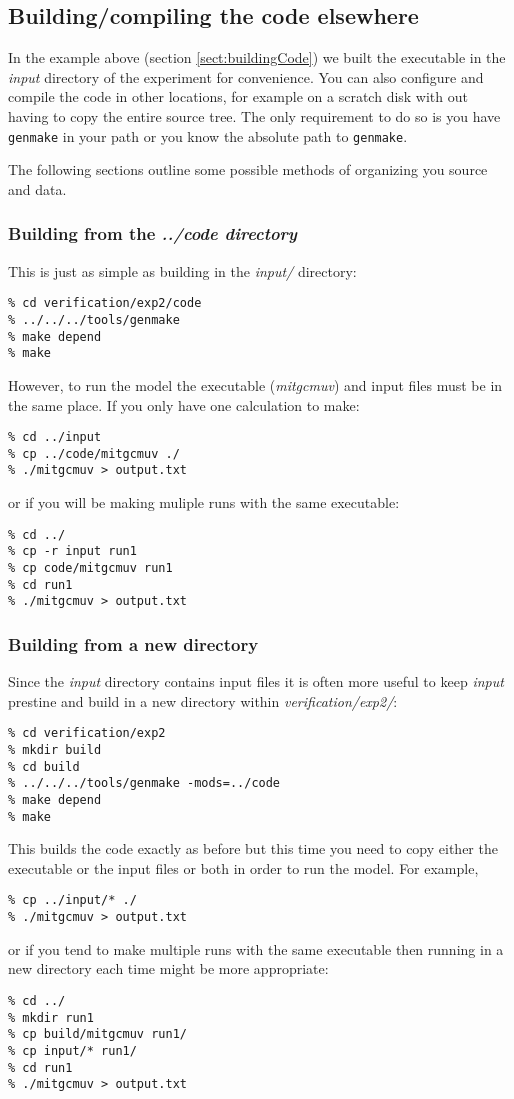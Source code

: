 \subsection{Building/compiling the code elsewhere}

In the example above (section \ref{sect:buildingCode}) we built the
executable in the {\em input} directory of the experiment for
convenience. You can also configure and compile the code in other
locations, for example on a scratch disk with out having to copy the
entire source tree. The only requirement to do so is you have {\tt
genmake} in your path or you know the absolute path to {\tt genmake}.

The following sections outline some possible methods of organizing you
source and data.

\subsubsection{Building from the {\em ../code directory}}

This is just as simple as building in the {\em input/} directory:
\begin{verbatim}
% cd verification/exp2/code
% ../../../tools/genmake
% make depend
% make
\end{verbatim}
However, to run the model the executable ({\em mitgcmuv}) and input
files must be in the same place. If you only have one calculation to make:
\begin{verbatim}
% cd ../input
% cp ../code/mitgcmuv ./
% ./mitgcmuv > output.txt
\end{verbatim}
or if you will be making muliple runs with the same executable:
\begin{verbatim}
% cd ../
% cp -r input run1
% cp code/mitgcmuv run1
% cd run1
% ./mitgcmuv > output.txt
\end{verbatim}

\subsubsection{Building from a new directory}

Since the {\em input} directory contains input files it is often more
useful to keep {\em input} prestine and build in a new directory
within {\em verification/exp2/}:
\begin{verbatim}
% cd verification/exp2
% mkdir build
% cd build
% ../../../tools/genmake -mods=../code
% make depend
% make
\end{verbatim}
This builds the code exactly as before but this time you need to copy
either the executable or the input files or both in order to run the
model. For example,
\begin{verbatim}
% cp ../input/* ./
% ./mitgcmuv > output.txt
\end{verbatim}
or if you tend to make multiple runs with the same executable then
running in a new directory each time might be more appropriate:
\begin{verbatim}
% cd ../
% mkdir run1
% cp build/mitgcmuv run1/
% cp input/* run1/
% cd run1
% ./mitgcmuv > output.txt
\end{verbatim}

